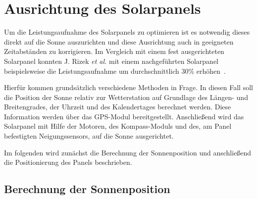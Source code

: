 
\section{Ausrichtung des Solarpanels}\label{sec:ausrichtung des Solarpanels}
Um die Leistungsaufnahme des Solarpanels zu optimieren ist es notwendig dieses direkt auf die Sonne auszurichten und diese Ausrichtung auch in geeigneten Zeitabständen zu korrigieren. Im Vergleich mit einem fest ausgerichteten Solarpanel konnten J. Rizek \emph{et al.} mit einem nachgeführten Solarpanel beispielsweise die Leistungsaufnahme um durchschnittlich 30\% erhöhen~\cite{Rizek2008}.

Hierfür kommen grundsätzlich verschiedene Methoden in Frage. In diesen Fall soll die Position der Sonne relativ zur Wetterstation auf Grundlage des Längen- und Breitengrades, der Uhrzeit und des Kalendertages berechnet werden. Diese Information werden über das GPS-Modul bereitgestellt. Anschließend wird das Solarpanel mit Hilfe der Motoren, des Kompass-Moduls und des, am Panel befestigten Neigungssensors, auf die Sonne ausgerichtet.

Im folgenden wird zunächst die Berechnung der Sonnenposition und anschließend die Positionierung des Panels beschrieben.

\subsection{Berechnung der Sonnenposition}\label{sec:berechnung_der_sonnenposition}



